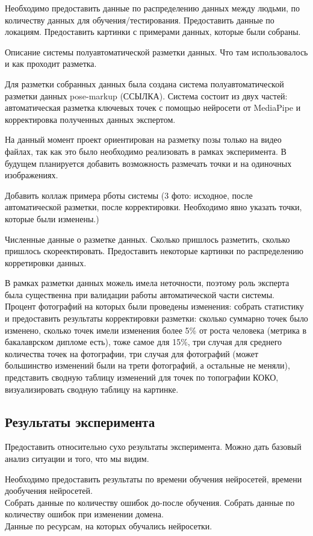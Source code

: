 Необходимо предоставить данные по распределению данных между людьми, по количеству данных для обучения/тестирования. Предоставить данные по локациям. Предоставить картинки с примерами данных, которые были собраны.

Описание системы полуавтоматической разметки данных. Что там использовалось и как проходит разметка.

Для разметки собранных данных была создана система полуавтоматической разметки данных pose-markup (ССЫЛКА). Система состоит из двух частей: автоматическая разметка ключевых точек с помощью нейросети от MediaPipe и корректировка полученных данных экспертом.

На данный момент проект ориентирован на разметку позы только на видео файлах, так как это было необходимо реализовать в рамках эксперимента. В будущем планируется добавить возможность размечать точки и на одиночных изображениях.

Добавить коллаж примера рботы системы (3 фото: исходное, после автоматической разметки, после корректировки. Необходимо явно указать точки, которые были изменены.)

Численные данные о разметке данных. Сколько пришлось разметить, сколько пришлось скореектировать. Предоставить некоторые картинки по распределению корретировки данных.

В рамках разметки данных можель имела неточности, поэтому роль эксперта была существенна при валидации работы автоматической части системы. Процент фотографий на которых были проведены изменения: собрать статистику и предоставить результаты корректировки разметки: сколько суммарно точек было изменено, сколько точек имели изменения более 5\% от роста человека (метрика в бакалаврском дипломе есть), тоже самое для 15\%, три случая для среднего количества точек на фотографии, три случая для фотографий (может большинство изменений были на трети фотографий, а остальные не меняли), представить сводную таблицу изменений для точек по топографии КОКО, визуализировать сводную таблицу на картинке. 

\subsection{Результаты эксперимента}

Предоставить относительно сухо результаты эксперимента. Можно дать базовый анализ ситуации и того, что мы видим.

Необходимо предоставить результаты по времени обучения нейросетей, времени дообучения нейросетей. \\ 
Собрать данные по количеству ошибок до-после обучения. Собрать данные по количеству ошибок при изменении домена. \\ 
Данные по ресурсам, на которых обучались нейросетки.


\newpage